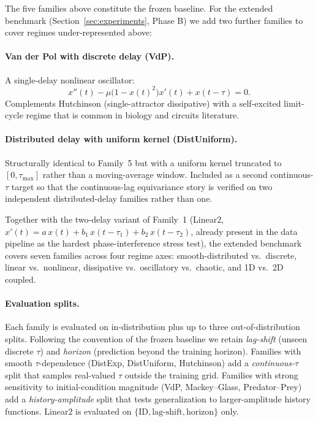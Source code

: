 The five families above constitute the frozen baseline.  For the
extended benchmark (Section~\ref{sec:experiments}, Phase B) we add
two further families to cover regimes under-represented above:

\paragraph{Van der Pol with discrete delay (VdP).}
A single-delay nonlinear oscillator:
\begin{equation}
  x''(t) - \mu \bigl(1 - x(t)^2\bigr) x'(t) + x(t - \tau) = 0.
\end{equation}
Complements Hutchinson (single-attractor dissipative) with a
self-excited limit-cycle regime that is common in biology and
circuits literature.

\paragraph{Distributed delay with uniform kernel (DistUniform).}
Structurally identical to Family~5 but with a uniform kernel truncated
to $[0, \tau_{\max}]$ rather than a moving-average window.  Included as
a second continuous-$\tau$ target so that the continuous-lag
equivariance story is verified on two independent distributed-delay
families rather than one.

Together with the two-delay variant of Family~1
(Linear2, $x'(t) = a\,x(t) + b_1\,x(t - \tau_1) + b_2\,x(t - \tau_2)$,
already present in the data pipeline as the hardest phase-interference
stress test), the extended benchmark covers seven families across
four regime axes: smooth-distributed vs.\ discrete, linear vs.\
nonlinear, dissipative vs.\ oscillatory vs.\ chaotic, and 1D vs.\ 2D
coupled.

\paragraph{Evaluation splits.}
Each family is evaluated on in-distribution plus up to three
out-of-distribution splits.  Following the convention of the frozen
baseline we retain \emph{lag-shift} (unseen discrete $\tau$) and
\emph{horizon} (prediction beyond the training horizon).  Families
with smooth $\tau$-dependence (DistExp, DistUniform, Hutchinson) add
a \emph{continuous-$\tau$} split that samples real-valued $\tau$
outside the training grid.  Families with strong sensitivity to
initial-condition magnitude (VdP, Mackey--Glass, Predator--Prey) add
a \emph{history-amplitude} split that tests generalization to
larger-amplitude history functions.  Linear2 is evaluated on
$\{\text{ID}, \text{lag-shift}, \text{horizon}\}$ only.
